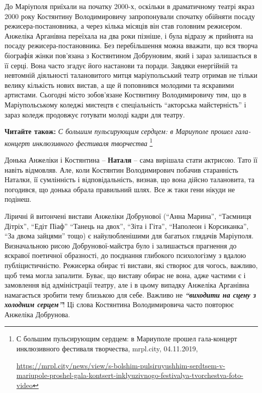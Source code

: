 
До Маріуполя приїхали на початку 2000-х, оскільки в драматичному театрі якраз
2000 року Костянтину Володимировичу запропонували спочатку обійняти посаду
режисера-постановника, а через кілька місяців він став головним режисером.
Анжеліка Арганівна переїхала на два роки пізніше, і була відразу ж прийнята на
посаду режисера-постановника. Без перебільшення можна вважати, що вся творча
біографія жінки пов'язана з Костянтином Добруновим, який і зараз залишається в
її серці. Вона часто згадує його настанови та поради. Завдяки енергійній та
невтомній діяльності талановитого митця маріупольський театр отримав не тільки
велику кількість нових вистав, а ще й поповнився молодими та яскравими
артистами. Сьогодні місто зобов'язане Костянтину Володимировичу тим, що в
Маріупольському коледжі мистецтв є спеціальність \enquote{акторська майстерність} і
зараз коледж продовжує готувати молоді кадри для театру.


\textbf{Читайте також:} \emph{С большим пульсирующим сердцем: в Мариуполе прошел гала-концерт инклюзивного фестиваля творчества}%
\footnote{С большим пульсирующим сердцем: в Мариуполе прошел гала-концерт инклюзивного фестиваля творчества, mrpl.city, 04.11.2019, \par%
\url{https://mrpl.city/news/view/s-bolshim-pulsiruyushhim-serdtsem-v-mariupole-proshel-gala-kontsert-inklyuzivnogo-festivalya-tvorchestva-foto-video}}


Донька Анжеліки і Костянтина – \textbf{Наталя} – сама вирішала стати актрисою. Тато її
навіть відмовляв. Але, коли Костянтин Володимирович побачив старанність
Наталки, її сумлінність і відповідальність, визнав, що вона дійсно талановита,
та погодився, що донька обрала правильний шлях. Все ж таки гени нікуди не
подінеш.


Ліричні й витончені вистави Анжеліки Добрунової (\enquote{Анна Марина}, \enquote{Таємниця
Дітріх}, \enquote{Едіт Піаф} \enquote{Танець на двох}, \enquote{Зіта і Гіта}, \enquote{Наполеон і Корсиканка},
\enquote{За двома зайцями} тощо) є найулюбленішими для багатьох глядачів Маріуполя.
Визначальною рисою Добрунової-майстра було і залишається прагнення до яскравої
поетичної образності, до поєднання глибокого психологізму з вдалою
публіцистичністю. Режисерка обирає ті вистави, які створює для чогось, важливо,
щоб тема могла запалити. Буває, що виставу обирає не вона, адже частими є і
замовлення від адміністрації театру, але і в цьому випадку Анжеліка Арганівна
намагається зробити тему близькою для себе. Важливо не \emph{\textbf{\enquote{виходити на сцену з
холодним серцем}}}! Ці слова Костянтина Володимировича часто повторює Анжеліка
Добрунова.

